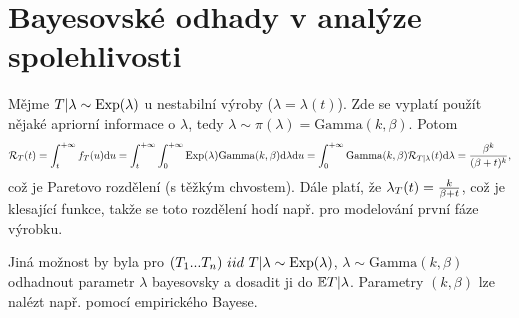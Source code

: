 \section{Bayesovské odhady v analýze spolehlivosti}

\begin{define}
	Mějme $T|\lambda\sim \mathrm{Exp}(\lambda)$ u nestabilní výroby ($\lambda=\lambda(t)$). Zde se vyplatí použít nějaké apriorní informace o $\lambda$, tedy $\lambda\sim\pi(\lambda)=\mathrm{Gamma}(k,\beta)$. Potom
	$$ \mathcal{R}_T(t)=\int_{t}^{+\infty}f_T(u)\mathrm{d} u=\int_{t}^{+\infty}\int_{0}^{+\infty}\mathrm{Exp}(\lambda)\mathrm{Gamma}(k,\beta)\mathrm{d}\lambda\mathrm{d} u =\int_{0}^{+\infty}\mathrm{Gamma}(k,\beta)\mathcal{R}_{T|\lambda}(t)\mathrm{d}\lambda=\frac{\beta^k}{(\beta+t)^k}, $$
	což je Paretovo rozdělení (s těžkým chvostem). Dále platí, že $\lambda_T(t)=\frac{k}{\beta+t}$, což je klesající funkce, takže se toto rozdělení hodí např. pro modelování první fáze výrobku.
\end{define}

\begin{example}
	Jiná možnost by byla pro $(T_1...T_n)~iid~T|\lambda\sim\mathrm{Exp}(\lambda)$, $\lambda\sim\mathrm{Gamma}(k,\beta)$ odhadnout parametr $\lambda$ bayesovsky a dosadit ji do $\mathbb{E} T|\lambda$. Parametry $(k, \beta)$ lze nalézt např. pomocí empirického Bayese.
\end{example}



